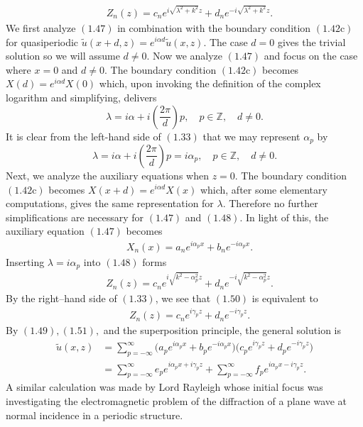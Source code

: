 \begin{align}
\quad Z_n(z)=c_ne^{i\sqrt{\lambda^2+k^2}z} + d_ne^{-i\sqrt{\lambda^2+k^2}z}.
\end{align}
We first analyze $(1.47)$ in combination with the boundary condition $(1.42\text{c})$ for quasiperiodic $\tilde{u}(x+d,z)=e^{i\alpha d}\tilde{u}(x,z)$. The case $d=0$ gives the trivial solution so we will assume $d\neq 0$. Now we analyze $(1.47)$ and focus on the case where $x=0$ and $d\neq 0$. The boundary condition $(1.42\text{c})$ becomes $X(d)=e^{i\alpha d}X(0)$ which, upon invoking the definition of the complex logarithm and simplifying, delivers
$$ \lambda = i\alpha+i\left(\frac{2\pi }{d}\right)p,\quad p\in\mathbb  Z, \quad d\neq 0.$$
It is clear from the left-hand side of $(1.33)$ that we may represent $\alpha_p$ by
$$ \lambda = i\alpha+i\left(\frac{2\pi }{d}\right)p=i\alpha_p,\quad p\in\mathbb  Z, \quad d\neq 0.$$
Next, we analyze the auxiliary equations when $z=0.$ The boundary condition $(1.42\text{c})$ becomes $X(x+d)=e^{i\alpha d}X(x)$ which, after some elementary computations, gives the same representation for $\lambda$. Therefore no further simplifications are necessary for $(1.47)$ and $(1.48)$. In light of this, the auxiliary equation $(1.47)$ becomes
\begin{align}
\quad X_n(x)=a_ne^{i\alpha_p x} + b_ne^{-i\alpha_p x}.
\end{align}
Inserting $\lambda=i\alpha_p$ into $(1.48)$ forms
\begin{align}
\quad Z_n(z)=c_ne^{i\sqrt{k^2-\alpha_p^2}z} + d_ne^{-i\sqrt{k^2-\alpha_p^2}z}.
\end{align}
By the right--hand side of $(1.33)$, we see that $(1.50)$ is equivalent to
\begin{align}
\quad Z_n(z)=c_ne^{i\gamma_p z} + d_ne^{-i\gamma_p z}.
\end{align}
By $(1.49),(1.51),$ and the superposition principle, the general solution is
\begin{align*}
\tilde{u}(x,z)&=\sum_{p=-\infty}^{\infty}\Big( a_pe^{i\alpha_p x} + b_pe^{-i\alpha_p x}\Big)\Big(c_pe^{i\gamma_p z} + d_pe^{-i\gamma_p z}\Big)\\&=
\sum_{p=-\infty}^{\infty}e_pe^{i\alpha_p x + i\gamma_p z} + \sum_{p=-\infty}^{\infty}f_pe^{i\alpha_p x - i\gamma_p z}.
\end{align*}
A similar calculation was made by Lord Rayleigh whose initial focus was investigating the electromagnetic problem of the diffraction of a plane wave at normal incidence \cite{rayleigh1881x,rayleigh1894theory,rayleigh1907dynamical} in a periodic structure.